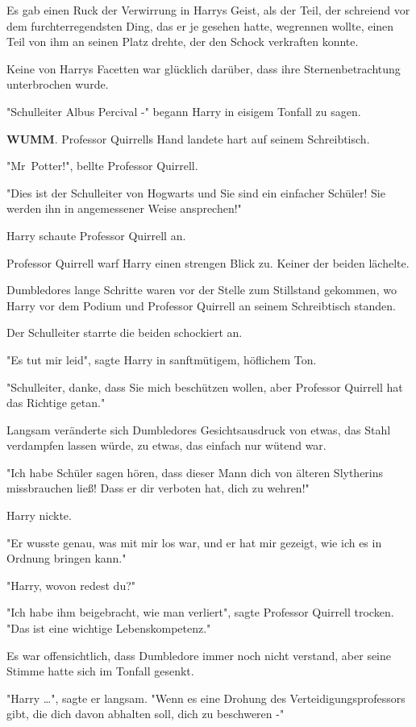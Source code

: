{Es gab einen Ruck der Verwirrung in Harrys Geist, als der Teil, der schreiend vor dem furchterregendsten Ding, das er je gesehen hatte, wegrennen wollte, einen Teil von ihm an seinen Platz drehte, der den Schock verkraften konnte.

Keine von Harrys Facetten war glücklich darüber, dass ihre Sternenbetrachtung unterbrochen wurde.

"Schulleiter Albus Percival -" begann Harry in eisigem Tonfall zu sagen.

\textbf{WUMM}. Professor Quirrells Hand landete hart auf seinem Schreibtisch.

"Mr~Potter!", bellte Professor Quirrell.

"Dies ist der Schulleiter von Hogwarts und Sie sind ein einfacher Schüler! Sie werden ihn in angemessener Weise ansprechen!"

Harry schaute Professor Quirrell an.

Professor Quirrell warf Harry einen strengen Blick zu. Keiner der beiden lächelte.

Dumbledores lange Schritte waren vor der Stelle zum Stillstand gekommen, wo Harry vor dem Podium und Professor Quirrell an seinem Schreibtisch standen.

Der Schulleiter starrte die beiden schockiert an.

"Es tut mir leid", sagte Harry in sanftmütigem, höflichem Ton.

"Schulleiter, danke, dass Sie mich beschützen wollen, aber Professor Quirrell hat das Richtige getan."

Langsam veränderte sich Dumbledores Gesichtsausdruck von etwas, das Stahl verdampfen lassen würde, zu etwas, das einfach nur wütend war.

"Ich habe Schüler sagen hören, dass dieser Mann dich von älteren Slytherins missbrauchen ließ! Dass er dir verboten hat, dich zu wehren!"

Harry nickte.

"Er wusste genau, was mit mir los war, und er hat mir gezeigt, wie ich es in Ordnung bringen kann."

"Harry, wovon redest du?"

"Ich habe ihm beigebracht, wie man verliert", sagte Professor Quirrell trocken. "Das ist eine wichtige Lebenskompetenz."

Es war offensichtlich, dass Dumbledore immer noch nicht verstand, aber seine Stimme hatte sich im Tonfall gesenkt.

"Harry …", sagte er langsam. "Wenn es eine Drohung des Verteidigungsprofessors gibt, die dich davon abhalten soll, dich zu beschweren -"

}
